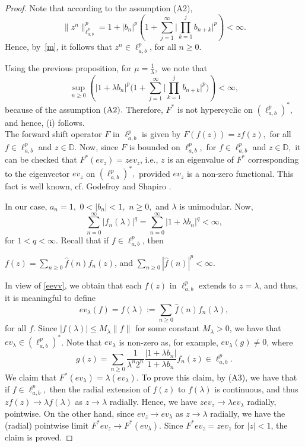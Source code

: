 \documentclass[12pt, reqno]{amsart}
\theoremstyle{definition}
\theoremstyle{remark}
\numberwithin{equation}{section}
\begin{document}
\begin{proof}
Note that according to the assumption (A2), 
\[
\|z^{n}\|_{\ell^p_{a,b}}^{p}
=1+|b_{n}|^{p}\left(1 +\sum_{j=1}^{\infty}
\Big|\prod_{k=1}^{j} b_{n+k}\Big|^{p}\right)
<\infty.
\]
Hence, by~\eqref{m}, it follows that $z^{n}\in \ell^{p}_{a,b}$, for all $n\geq 0$. 

Using the previous proposition, for $\mu=\frac{1}{\lambda},$ we note that
\[
\sup_{n\geq 0}\left(|1+\lambda b_{n}|^{p}\Big(1+\sum_{j=1}^{\infty}
\Big|\prod_{k=1}^{j} b_{n+k}
\Big|^{p}\Big)\right)<\infty,
\]
because of the assumption $\textnormal{(A2)}.$ Therefore, $F^{*}$ is not hypercyclic on $(\ell^{p}_{a,b})^{*}$, and hence, (i) follows.\\
The  forward shift operator $F$ in $\ell^{p}_{a,b}$  is given by $F(f(z))=zf(z),$ for all $f \in \ell^{p}_{a,b}$ and $z \in \mathbb{D}.$ Now, since $F$ is bounded on $\ell^{p}_{a,b},$ for $f \in \ell^{p}_{a,b}$ and $z \in \mathbb{D},$ it can be checked that $F^{*}(ev_{z})=z ev_z$, i.e., $z$ is an eigenvalue of $F^{*}$ corresponding to the eigenvector $ev_{z}$ on $(\ell^{p}_{a,b})^{*},$ provided $ev_z$ is a non-zero functional. This fact is well known, cf. Godefroy and Shapiro \cite{Godefroy-Shapiro}. 

In our case, $a_{n}=1,$ $0<\lvert b_{n} \rvert<1,$ $n\geq 0,$ and $\lambda$ is unimodular. Now,
\begin{equation}\label{eevv}
\sum_{n=0}^{\infty} \lvert f_{n}(\lambda)\rvert^{q}= \sum_{n=0}^{\infty} |1+\lambda b_n|^q <\infty,
\end{equation}
for $1<q<\infty.$ Recall that if $f\in \ell^p_{a,b}$, then 
\begin{center}
$f(z)=\sum_{n\geq 0} \widehat{f}(n) f_n(z)$, and $\sum_{n\geq 0}|\widehat{f}(n)|^p<\infty$.
\end{center}
In view of \eqref{eevv}, we obtain that each $f(z)$ in $\ell^p_{a,b}$ extends to $z=\lambda$, and thus, it is meaningful to define 
\[
ev_{\lambda}(f)=f(\lambda):=\sum_{n\geq 0} \widehat{f}(n) f_n(\lambda),
\]
for all $f$. Since $|f(\lambda)|\leq M_{\lambda}\|f\|$ for some constant $M_{\lambda}>0$, we have that $ev_{\lambda} \in (\ell^{p}_{a,b})^{*}$. Note that $ev_{\lambda}$ is non-zero as, for example, $ev_{\lambda}(g)\neq 0$, where 
\[
g(z)=\sum_{n\geq 0} \frac{1}{\lambda^n 2^n} \frac{|1+\lambda b_n|}{1+\lambda b_n}f_n(z) \in \ell^p_{a,b}.
\]
 \noindent We claim that $F^{*}(ev_{\lambda})=\lambda(ev_{\lambda})$. To prove this claim, by (A3), we have that if $f\in \ell^p_{a,b},$ then the radial extension of $f(z)$ to $f(\lambda)$ is continuous, and thus $zf(z)\rightarrow \lambda f(\lambda)$ as $z\rightarrow \lambda$ radially. Hence, we have $zev_z\rightarrow \lambda ev_{\lambda}$ radially, pointwise. On the other hand, since $ev_z\rightarrow ev_{\lambda}$ as $z\rightarrow \lambda$ radially, we have the (radial) pointwise limit $F^*{ev_z}\rightarrow F^*(ev_{\lambda})$. Since $F^*{ev_z}=zev_z$ for $|z|<1$, the claim is proved.


\end{proof}
\end{document}
